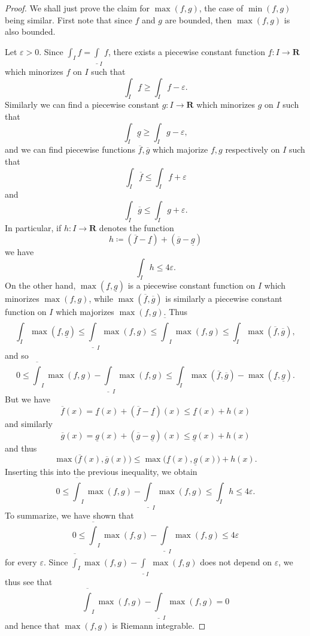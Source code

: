\begin{proof}
    We shall just prove the claim for \(\max(f, g)\), the case of \(\min(f, g)\) being similar.
    First note that since \(f\) and \(g\) are bounded, then \(\max(f, g)\) is also bounded.

    Let \(\varepsilon > 0\).
    Since \(\int_I f = \underline{\int}_I f\), there exists a piecewise constant function \(\underline{f} : I \to \mathbf{R}\) which minorizes \(f\) on \(I\) such that
    \[
        \int_I \underline{f} \geq \int_I f - \varepsilon.
    \]
    Similarly we can find a piecewise constant \(g : I \to \mathbf{R}\) which minorizes \(g\) on \(I\) such that
    \[
        \int_I \underline{g} \geq \int_I g - \varepsilon,
    \]
    and we can find piecewise functions \(\overline{f}, \overline{g}\) which majorize \(f, g\) respectively on \(I\) such that
    \[
        \int_I \overline{f} \leq \int_I f + \varepsilon
    \]
    and
    \[
        \int_I \overline{g} \leq \int_I g + \varepsilon.
    \]
    In particular, if \(h : I \to \mathbf{R}\) denotes the function
    \[
        h \coloneqq (\overline{f} - \underline{f}) + (\overline{g} - \underline{g})
    \]
    we have
    \[
        \int_I h \leq 4 \varepsilon.
    \]
    On the other hand, \(\max(\underline{f}, \underline{g})\) is a piecewise constant function on \(I\) which minorizes \(\max(f, g)\), while \(\max(\overline{f}, \overline{g})\) is similarly a piecewise constant function on \(I\) which majorizes \(\max(f, g)\).
    Thus
    \[
        \int_I \max(\underline{f}, \underline{g}) \leq \underline{\int}_I \max(f, g) \leq \overline{\int}_I \max(f, g) \leq \int_I \max(\overline{f}, \overline{g}),
    \]
    and so
    \[
        0 \leq \overline{\int}_I \max(f, g) - \underline{\int}_I \max(f, g) \leq \int_I \max(\overline{f}, \overline{g}) - \max(\underline{f}, \underline{g}).
    \]
    But we have
    \[
        \overline{f}(x) = \underline{f}(x) + (\overline{f} - \underline{f})(x) \leq \underline{f}(x) + h(x)
    \]
    and similarly
    \[
        \overline{g}(x) = \underline{g}(x) + (\overline{g} - \underline{g})(x) \leq \underline{g}(x) + h(x)
    \]
    and thus
    \[
        \max\big(\overline{f}(x), \overline{g}(x)\big) \leq \max\big(\underline{f}(x), \underline{g}(x)\big) + h(x).
    \]
    Inserting this into the previous inequality, we obtain
    \[
        0 \leq \overline{\int}_I \max(f, g) - \underline{\int}_I \max(f, g) \leq \int_I h \leq 4 \varepsilon.
    \]
    To summarize, we have shown that
    \[
        0 \leq \overline{\int}_I \max(f, g) - \underline{\int}_I \max(f, g) \leq 4 \varepsilon
    \]
    for every \(\varepsilon\).
    Since \(\overline{\int}_I \max(f, g) - \underline{\int}_I \max(f, g)\) does not depend on \(\varepsilon\), we thus see that
    \[
        \overline{\int}_I \max(f, g) - \underline{\int}_I \max(f, g) = 0
    \]
    and hence that \(\max(f, g)\) is Riemann integrable.
\end{proof}


